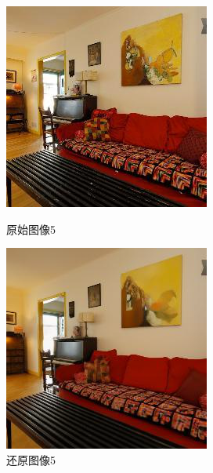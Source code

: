 \begin{figure}[H]
\begin{minipage}[b]{0.3\linewidth}
    \includegraphics[width=\linewidth]{Picture/label/00007.png}
    \caption{原始图像5}
    \label{original image  5}
  \end{minipage}
\hspace{0.1cm}
  \begin{minipage}[b]{0.3\linewidth}
    \includegraphics[width=\linewidth]{Picture/recon/00007.png}
    \caption{还原图像5}
    \label{inpainted image 5}
  \end{minipage}
  \label{整块损坏图像}
\end{figure}

